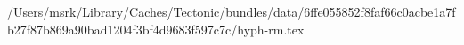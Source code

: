 /Users/msrk/Library/Caches/Tectonic/bundles/data/6ffe055852f8faf66c0acbe1a7fb27f87b869a90bad1204f3bf4d9683f597c7c/hyph-rm.tex